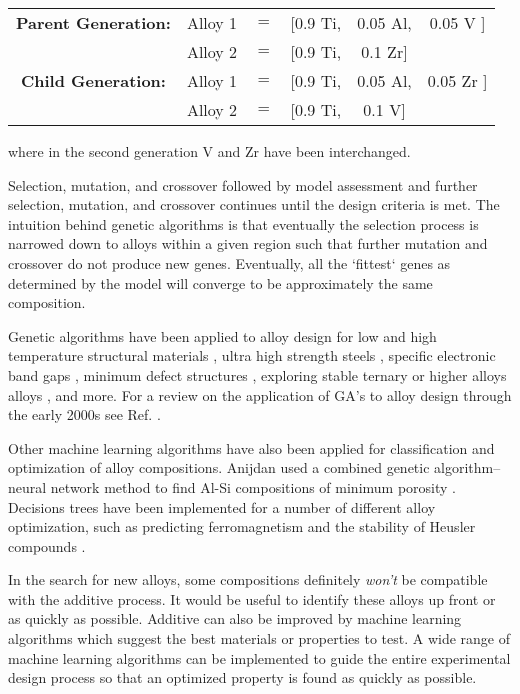 \begin{table}[h!]
\begin{center}
\begin{tabular}{c|ccccc}
	\textbf{Parent Generation:} & Alloy 1 & $=$ & [0.9 Ti, & 0.05 Al, & 0.05 {\color{red} V} ]  \\
						 & Alloy 2 & $=$ & [0.9 Ti, & 0.1 {\color{green} Zr}] &              \\ \hline
 

	 \textbf{Child Generation:} & Alloy 1 & $=$ & [0.9 Ti, & 0.05 Al, & 0.05 {\color{green} Zr} ]  \\
						& Alloy 2 & $=$ & [0.9 Ti, & 0.1 {\color{red} V}] &              \\ 
\end{tabular}
\end{center}
\end{table}
where in the second generation V and Zr have been interchanged. 

Selection, mutation, and crossover followed by model assessment and further selection, mutation, and crossover continues until the design criteria is met. The intuition behind genetic algorithms is that eventually the selection process is narrowed down to alloys within a given region such that further mutation and crossover do not produce new genes. Eventually, all the `fittest` genes as determined by the model will converge to be approximately the same composition. 

Genetic algorithms have been applied to alloy design for low and high temperature structural materials \cite{Ikeda1997, Kulkarni2004}, ultra high strength steels \cite{Xu2008}, specific electronic band gaps \cite{Dudiy2006}, minimum defect structures \cite{Anijdan2006}, exploring stable ternary or higher alloys alloys \cite{Hautier2010, Johannesson2002}, and more. For a review on the application of GA's to alloy design through the early 2000s see Ref. \cite{Chakraborti2004}.

Other machine learning algorithms have also been applied for classification and optimization of alloy compositions. Anijdan used a combined genetic algorithm--neural network method to find Al-Si compositions of minimum porosity \cite{Anijdan2006}. Decisions trees have been implemented for a number of different alloy optimization, such as predicting ferromagnetism \cite{Landrum2003} and the stability of Heusler compounds \cite{Oliynyk2016}. 
 
In the search for new alloys, some compositions definitely \textit{won't} be compatible with the additive process. It would be useful to identify these alloys up front or as quickly as possible. Additive can also be improved by machine learning algorithms which suggest the best materials or properties to test. A wide range of machine learning algorithms can be implemented to guide the entire experimental design process so that an optimized property is found as quickly as possible. 